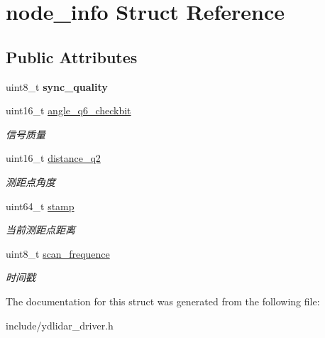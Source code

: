 \hypertarget{structnode__info}{}\section{node\+\_\+info Struct Reference}
\label{structnode__info}
\subsection*{Public Attributes}
\begin{DoxyCompactItemize}
\item 
uint8\+\_\+t {\bfseries sync\+\_\+quality}\hypertarget{structnode__info_a45f5ed4efbe416d43171d63c669f02da}{}\label{structnode__info_a45f5ed4efbe416d43171d63c669f02da}

\item 
uint16\+\_\+t \hyperlink{structnode__info_a73e1d282a573f3daa74332fe29b90a26}{angle\+\_\+q6\+\_\+checkbit}\hypertarget{structnode__info_a73e1d282a573f3daa74332fe29b90a26}{}\label{structnode__info_a73e1d282a573f3daa74332fe29b90a26}

\begin{DoxyCompactList}\small\item\em 信号质量 \end{DoxyCompactList}\item 
uint16\+\_\+t \hyperlink{structnode__info_a82eaf27a6196e803d3618c83b052f78c}{distance\+\_\+q2}\hypertarget{structnode__info_a82eaf27a6196e803d3618c83b052f78c}{}\label{structnode__info_a82eaf27a6196e803d3618c83b052f78c}

\begin{DoxyCompactList}\small\item\em 测距点角度 \end{DoxyCompactList}\item 
uint64\+\_\+t \hyperlink{structnode__info_a92f30331da1d7d95f9998dcd3886574c}{stamp}\hypertarget{structnode__info_a92f30331da1d7d95f9998dcd3886574c}{}\label{structnode__info_a92f30331da1d7d95f9998dcd3886574c}

\begin{DoxyCompactList}\small\item\em 当前测距点距离 \end{DoxyCompactList}\item 
uint8\+\_\+t \hyperlink{structnode__info_a718a8a2f94497d5edea2be4550f74348}{scan\+\_\+frequence}\hypertarget{structnode__info_a718a8a2f94497d5edea2be4550f74348}{}\label{structnode__info_a718a8a2f94497d5edea2be4550f74348}

\begin{DoxyCompactList}\small\item\em 时间戳 \end{DoxyCompactList}\end{DoxyCompactItemize}


The documentation for this struct was generated from the following file\+:\begin{DoxyCompactItemize}
\item 
include/ydlidar\+\_\+driver.\+h\end{DoxyCompactItemize}
